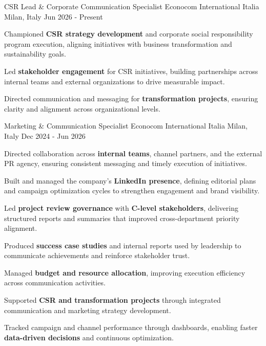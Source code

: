 
\begin{cventries}

\cventry
{CSR Lead \& Corporate Communication Specialist} %
{Econocom International Italia} %
{Milan, Italy} %
{Jun 2026 - Present} %
{
\begin{cvitems}
\item Championed \textbf{CSR strategy development} and corporate social responsibility program execution, aligning initiatives with business transformation and sustainability goals.
\item Led \textbf{stakeholder engagement} for CSR initiatives, building partnerships across internal teams and external organizations to drive measurable impact.
\item Directed communication and messaging for \textbf{transformation projects}, ensuring clarity and alignment across organizational levels.
\end{cvitems}
}

\cventry
{Marketing \& Communication Specialist} %
{Econocom International Italia} %
{Milan, Italy} %
{Dec 2024 - Jun 2026} %
{
\begin{cvitems}
\item Directed collaboration across \textbf{internal teams}, channel partners, and the external PR agency, ensuring consistent messaging and timely execution of initiatives.
\item Built and managed the company's \textbf{LinkedIn presence}, defining editorial plans and campaign optimization cycles to strengthen engagement and brand visibility.
\item Led \textbf{project review governance} with \textbf{C-level stakeholders}, delivering structured reports and summaries that improved cross-department priority alignment.
\item Produced \textbf{success case studies} and internal reports used by leadership to communicate achievements and reinforce stakeholder trust.
\item Managed \textbf{budget and resource allocation}, improving execution efficiency across communication activities.
\item Supported \textbf{CSR and transformation projects} through integrated communication and marketing strategy development.
\item Tracked campaign and channel performance through dashboards, enabling faster \textbf{data-driven decisions} and continuous optimization.
\end{cvitems}
}



\end{cventries}
